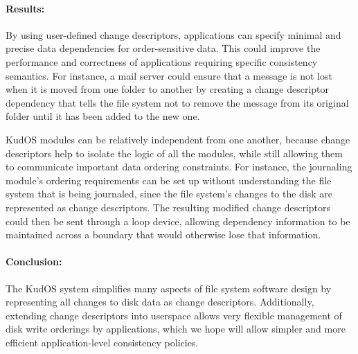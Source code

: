 \documentclass[12pt]{article}
\newcommand{\preparagraphspacing}{\vspace{-0.2in}}
\begin{document}
\preparagraphspacing
\paragraph{Results:}

By using user-defined change descriptors, applications can specify minimal and
precise data dependencies for order-sensitive data. This could improve the
performance and correctness of applications requiring specific consistency
semantics. For instance, a mail server could ensure that a message is not lost
when it is moved from one folder to another by creating a change descriptor
dependency that tells the file system not to remove the message from its
original folder until it has been added to the new one.


KudOS modules can be relatively independent from one another, because change
descriptors help to isolate the logic of all the modules, while still allowing
them to communicate important data ordering constraints. For instance, the
journaling module's ordering requirements can be set up without understanding
the file system that is being journaled, since the file system's changes to the
disk are represented as change descriptors. The resulting modified change
descriptors could then be sent through a loop device, allowing dependency
information to be maintained across a boundary that would otherwise lose that
information. 

\preparagraphspacing
\paragraph{Conclusion:}

The KudOS system simplifies many aspects of file system software design by
representing all changes to disk data as change descriptors. Additionally,
extending change descriptors into userspace allows very flexible management of
disk write orderings by applications, which we hope will allow simpler and more
efficient application-level consistency policies.
\end{document}
